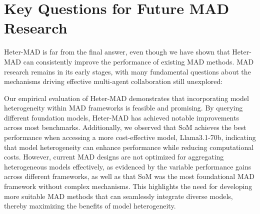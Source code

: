 \section{Key Questions for Future MAD Research} \label{sec:future}

Heter-MAD is far from the final answer, even though we have shown that Heter-MAD can consistently improve the performance of existing MAD methods.
MAD research remains in its early stages, with many fundamental questions about the mechanisms driving effective multi-agent collaboration still unexplored:

 Our empirical evaluation of Heter-MAD demonstrates that incorporating model heterogeneity within MAD frameworks is feasible and promising. By querying different foundation models, Heter-MAD has achieved notable improvements across most benchmarks. Additionally, we observed that SoM achieves the best performance when accessing a more cost-effective model, Llama3.1-70b, indicating that model heterogeneity can enhance performance while reducing computational costs. However, current MAD designs are not optimized for aggregating heterogeneous models effectively, as evidenced by the variable performance gains across different frameworks, as well as that SoM was the most foundational MAD framework without complex mechanisms. This highlights the need for developing more suitable MAD methods that can seamlessly integrate diverse models, thereby maximizing the benefits of model heterogeneity.


